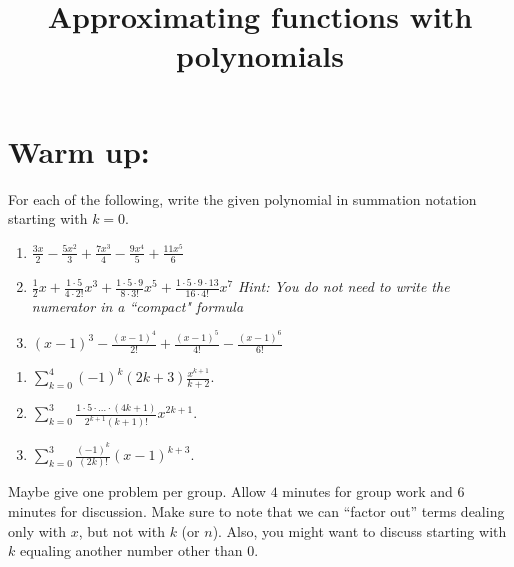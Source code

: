 \documentclass[]{ximera}
\title{Approximating functions with polynomials}
\begin{document}
\begin{abstract}		\end{abstract}
\maketitle



\section{Warm up:}
For each of the following, write the given polynomial in summation notation starting with $k=0$.
	\begin{enumerate}
	
	\item  $\frac{3x}{2} - \frac{5x^2}{3} + \frac{7x^3}{4} - \frac{9x^4}{5} + \frac{11x^5}{6}$
	
	\item  $\frac{1}{2}x + \frac{1 \cdot 5}{4 \cdot 2!}x^3 + \frac{1 \cdot 5 \cdot 9}{8 \cdot 3!}x^5 + \frac{1 \cdot 5 \cdot 9 \cdot 13}{16 \cdot 4!}x^7$ {\it Hint: You do not need to write the numerator in a ``compact" formula}
	
	\item  $(x-1)^3 - \frac{(x-1)^4}{2!} + \frac{(x-1)^5}{4!} - \frac{(x-1)^6}{6!} $
	
	\end{enumerate}
	
	\begin{freeResponse}
	\begin{enumerate}
	
	\item  $\sum_{k=0}^4 (-1)^k (2k+3) \frac{x^{k+1}}{k+2}$.  
	
	\item  $\sum_{k=0}^3 \frac{1 \cdot 5 \cdot \hdots \cdot (4k+1)}{2^{k+1} (k+1)!} x^{2k+1}.$
	
	\item  $\sum_{k=0}^3 \frac{(-1)^k}{(2k)!} (x-1)^{k+3}$.  
	
	\end{enumerate}
	\end{freeResponse}
	
\begin{instructorNotes}
Maybe give one problem per group.  
Allow $4$ minutes for group work and $6$ minutes for discussion.  
Make sure to note that we can ``factor out'' terms dealing only with $x$, but not with $k$ (or $n$).  
Also, you might want to discuss starting with $k$ equaling another number other than $0$.
\end{instructorNotes}
\end{document}
